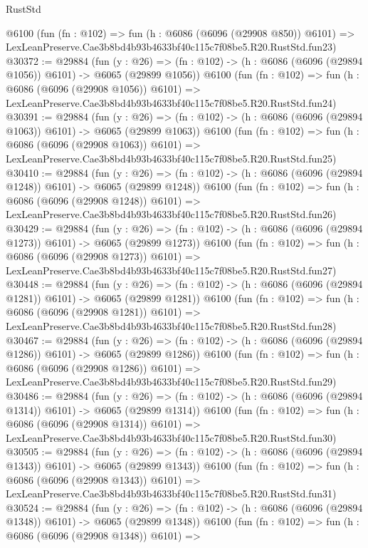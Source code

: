 \begin{lexlean}{RustStd}
\begin{coremodule}
    @6100
    (fun (fn : @102) =>
    fun (h : @6086 (@6096 (@29908 @850)) @6101) =>
    LexLeanPreserve.Cae3b8bd4b93b4633bf40c115c7f08be5.R20.RustStd.fun23)
@30372 := @29884
    (fun (y : @26) =>
    (fn : @102) -> (h : @6086 (@6096 (@29894 @1056)) @6101) -> @6065 (@29899 @1056))
    @6100
    (fun (fn : @102) =>
    fun (h : @6086 (@6096 (@29908 @1056)) @6101) =>
    LexLeanPreserve.Cae3b8bd4b93b4633bf40c115c7f08be5.R20.RustStd.fun24)
@30391 := @29884
    (fun (y : @26) =>
    (fn : @102) -> (h : @6086 (@6096 (@29894 @1063)) @6101) -> @6065 (@29899 @1063))
    @6100
    (fun (fn : @102) =>
    fun (h : @6086 (@6096 (@29908 @1063)) @6101) =>
    LexLeanPreserve.Cae3b8bd4b93b4633bf40c115c7f08be5.R20.RustStd.fun25)
@30410 := @29884
    (fun (y : @26) =>
    (fn : @102) -> (h : @6086 (@6096 (@29894 @1248)) @6101) -> @6065 (@29899 @1248))
    @6100
    (fun (fn : @102) =>
    fun (h : @6086 (@6096 (@29908 @1248)) @6101) =>
    LexLeanPreserve.Cae3b8bd4b93b4633bf40c115c7f08be5.R20.RustStd.fun26)
@30429 := @29884
    (fun (y : @26) =>
    (fn : @102) -> (h : @6086 (@6096 (@29894 @1273)) @6101) -> @6065 (@29899 @1273))
    @6100
    (fun (fn : @102) =>
    fun (h : @6086 (@6096 (@29908 @1273)) @6101) =>
    LexLeanPreserve.Cae3b8bd4b93b4633bf40c115c7f08be5.R20.RustStd.fun27)
@30448 := @29884
    (fun (y : @26) =>
    (fn : @102) -> (h : @6086 (@6096 (@29894 @1281)) @6101) -> @6065 (@29899 @1281))
    @6100
    (fun (fn : @102) =>
    fun (h : @6086 (@6096 (@29908 @1281)) @6101) =>
    LexLeanPreserve.Cae3b8bd4b93b4633bf40c115c7f08be5.R20.RustStd.fun28)
@30467 := @29884
    (fun (y : @26) =>
    (fn : @102) -> (h : @6086 (@6096 (@29894 @1286)) @6101) -> @6065 (@29899 @1286))
    @6100
    (fun (fn : @102) =>
    fun (h : @6086 (@6096 (@29908 @1286)) @6101) =>
    LexLeanPreserve.Cae3b8bd4b93b4633bf40c115c7f08be5.R20.RustStd.fun29)
@30486 := @29884
    (fun (y : @26) =>
    (fn : @102) -> (h : @6086 (@6096 (@29894 @1314)) @6101) -> @6065 (@29899 @1314))
    @6100
    (fun (fn : @102) =>
    fun (h : @6086 (@6096 (@29908 @1314)) @6101) =>
    LexLeanPreserve.Cae3b8bd4b93b4633bf40c115c7f08be5.R20.RustStd.fun30)
@30505 := @29884
    (fun (y : @26) =>
    (fn : @102) -> (h : @6086 (@6096 (@29894 @1343)) @6101) -> @6065 (@29899 @1343))
    @6100
    (fun (fn : @102) =>
    fun (h : @6086 (@6096 (@29908 @1343)) @6101) =>
    LexLeanPreserve.Cae3b8bd4b93b4633bf40c115c7f08be5.R20.RustStd.fun31)
@30524 := @29884
    (fun (y : @26) =>
    (fn : @102) -> (h : @6086 (@6096 (@29894 @1348)) @6101) -> @6065 (@29899 @1348))
    @6100
    (fun (fn : @102) =>
    fun (h : @6086 (@6096 (@29908 @1348)) @6101) =>

\end{coremodule}
\end{lexlean}
